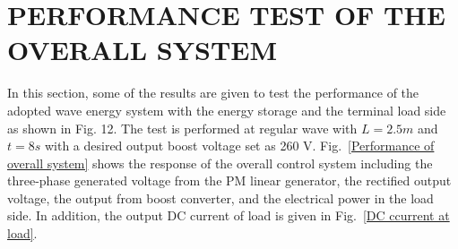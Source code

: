 \documentclass[conference]{IEEEtran}
\begin{document}
\section{PERFORMANCE TEST OF THE OVERALL SYSTEM}
In this section, some of the results are given to test the performance of the adopted wave energy system with the energy storage and the terminal load side as shown in Fig. 12. The test is performed at regular wave with $L = 2.5 m$ and $t = 8 s$ with a desired output boost voltage set as 260 V. Fig.~\ref{Performance of overall system} shows the response of the overall control system including the three-phase generated voltage from the PM linear generator, the rectified output voltage, the output from boost converter, and the electrical power in the load side. In addition, the output DC current of load is given in Fig.~\ref{DC ccurrent at load}.
\end{document}

